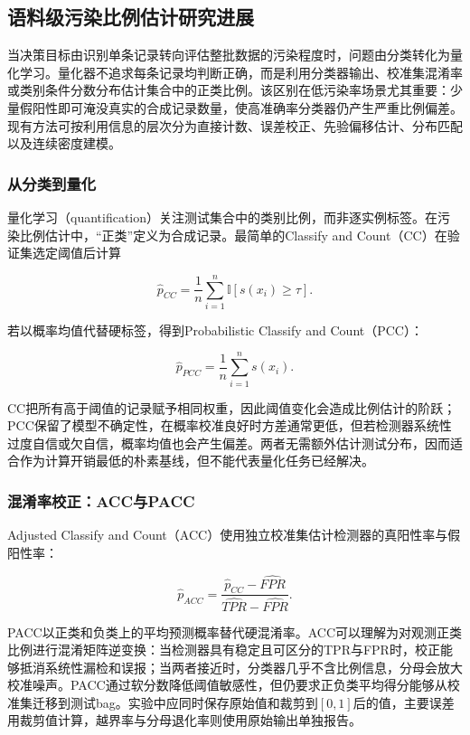 \documentclass[
  chinese,
  12pt,
  a4paper,
  chinese,
  UTF8]{ctexart}
\begin{document}
\subsection{语料级污染比例估计研究进展}\label{ux8bedux6599ux7ea7ux6c61ux67d3ux6bd4ux4f8bux4f30ux8ba1ux7814ux7a76ux8fdbux5c55}

当决策目标由识别单条记录转向评估整批数据的污染程度时，问题由分类转化为量化学习。量化器不追求每条记录均判断正确，而是利用分类器输出、校准集混淆率或类别条件分数分布估计集合中的正类比例。该区别在低污染率场景尤其重要：少量假阳性即可淹没真实的合成记录数量，使高准确率分类器仍产生严重比例偏差。现有方法可按利用信息的层次分为直接计数、误差校正、先验偏移估计、分布匹配以及连续密度建模。

\subsubsection{从分类到量化}\label{ux4eceux5206ux7c7bux5230ux91cfux5316}

量化学习（quantification）关注测试集合中的类别比例，而非逐实例标签\autocite{gonzalez2017review}。在污染比例估计中，``正类''定义为合成记录。最简单的Classify
and Count（CC）在验证集选定阈值后计算

\[\hat p_{CC}=\frac{1}{n}\sum_{i=1}^{n}\mathbb I[s(x_i)\ge \tau].\]

若以概率均值代替硬标签，得到Probabilistic Classify and Count（PCC）：

\[\hat p_{PCC}=\frac{1}{n}\sum_{i=1}^{n}s(x_i).\]

CC把所有高于阈值的记录赋予相同权重，因此阈值变化会造成比例估计的阶跃；PCC保留了模型不确定性，在概率校准良好时方差通常更低，但若检测器系统性过度自信或欠自信，概率均值也会产生偏差。两者无需额外估计测试分布，因而适合作为计算开销最低的朴素基线，但不能代表量化任务已经解决。

\subsubsection{混淆率校正：ACC与PACC}\label{ux6df7ux6dc6ux7387ux6821ux6b63accux4e0epacc}

Adjusted Classify and
Count（ACC）使用独立校准集估计检测器的真阳性率与假阳性率：

\[\hat p_{ACC}=\frac{\hat p_{CC}-\widehat{FPR}}{\widehat{TPR}-\widehat{FPR}}.\]

PACC以正类和负类上的平均预测概率替代硬混淆率\autocite{bella2010quantification}。ACC可以理解为对观测正类比例进行混淆矩阵逆变换：当检测器具有稳定且可区分的TPR与FPR时，校正能够抵消系统性漏检和误报；当两者接近时，分类器几乎不含比例信息，分母会放大校准噪声。PACC通过软分数降低阈值敏感性，但仍要求正负类平均得分能够从校准集迁移到测试bag。实验中应同时保存原始值和裁剪到\([0,1]\)后的值，主要误差用裁剪值计算，越界率与分母退化率则使用原始输出单独报告。
\end{document}
